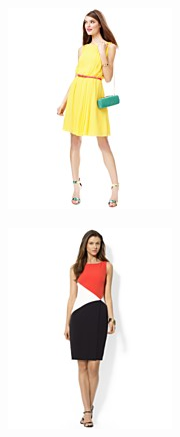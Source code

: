 \documentclass[11pt]{article}
\begin{document}
\begin{figure}
\begin{subfigure}{.18\textwidth}
\includegraphics[width=\linewidth]{concepts/concept2_neg4.jpg}
\label{fig:sub2}
\end{subfigure}
\begin{subfigure}{.18\textwidth}
\centering
\includegraphics[width=\linewidth]{concepts/concept2_neg5.jpg}

\end{subfigure}
\end{figure}
\end{document}
